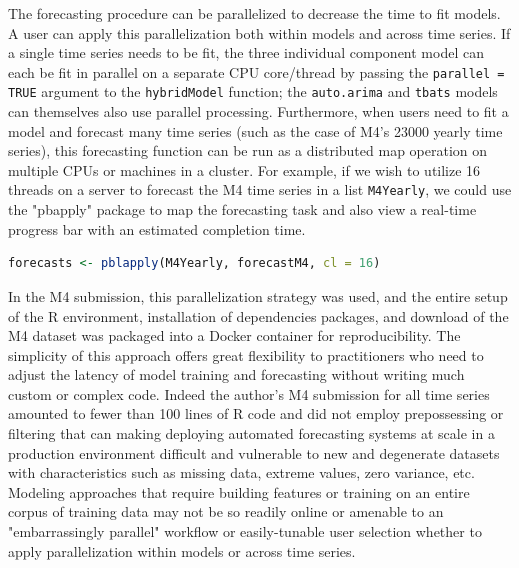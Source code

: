\documentclass[11pt,3p,review,authoryear]{elsarticle}
\begin{document}
The forecasting procedure can be parallelized to decrease the time to fit models. A user can apply this parallelization both within models and across time series. If a single time series needs to be fit, the three individual component model can each be fit in parallel on a separate CPU core/thread by passing the \texttt{parallel = TRUE} argument to the \texttt{hybridModel} function; the \texttt{auto.arima} and \texttt{tbats} models can themselves also use parallel processing. Furthermore, when users need to fit a model and forecast many time series (such as the case of M4's 23000 yearly time series), this forecasting function can be run as a distributed map operation on multiple CPUs or machines in a cluster. For example, if we wish to utilize 16 threads on a server to forecast the M4 time series in a list \texttt{M4Yearly}, we could use the "pbapply" package \citep{pbapply} to map the forecasting task and also view a real-time progress bar with an estimated completion time.

\begin{lstlisting}[language=R]
forecasts <- pblapply(M4Yearly, forecastM4, cl = 16)
\end{lstlisting}


In the M4 submission, this parallelization strategy was used, and the entire setup of the R environment, installation of dependencies packages, and download of the M4 dataset was packaged into a Docker container for reproducibility. The simplicity of this approach offers great flexibility to practitioners who need to adjust the latency of model training and forecasting without writing much custom or complex code. Indeed the author's M4 submission for all time series amounted to fewer than 100 lines of R code and did not employ prepossessing or filtering that can making deploying automated forecasting systems at scale in a production environment difficult and vulnerable to new and degenerate datasets with characteristics such as missing data, extreme values, zero variance, etc. Modeling approaches that require building features or training on an entire corpus of training data may not be so readily online or amenable to an "embarrassingly parallel" workflow or easily-tunable user selection whether to apply parallelization within models or across time series.
\end{document}

